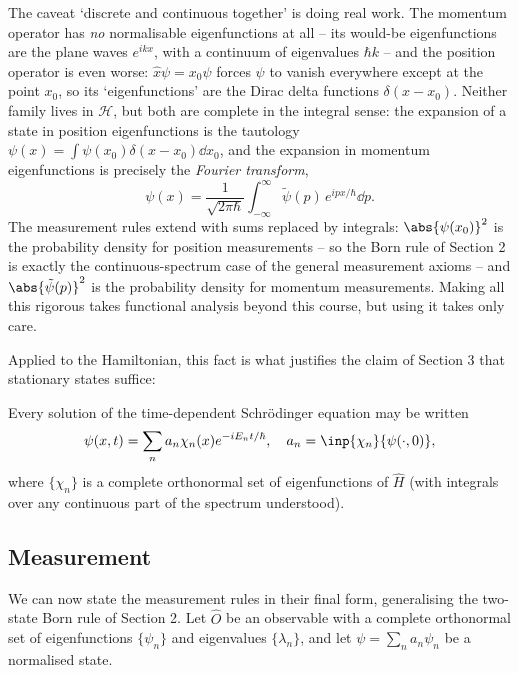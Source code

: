 \begin{remark}
    The caveat `discrete and continuous together' is doing real work. The momentum operator has \emph{no} normalisable eigenfunctions at all -- its would-be eigenfunctions are the plane waves $e^{ikx}$, with a continuum of eigenvalues $\hbar k$ -- and the position operator is even worse: $\hat{x}\psi = x_0 \psi$ forces $\psi$ to vanish everywhere except at the point $x_0$, so its `eigenfunctions' are the Dirac delta functions $\delta(x - x_0)$. Neither family lives in $\mathcal{H}$, but both are complete in the integral sense: the expansion of a state in position eigenfunctions is the tautology $\psi(x) = \int \psi(x_0) \delta(x - x_0) \dd x_0$, and the expansion in momentum eigenfunctions is precisely the \emph{Fourier transform},
    $$
    \psi(x) = \frac{1}{\sqrt{2\pi\hbar}} \int_{-\infty}^{\infty} \tilde{\psi}(p) \, e^{ipx/\hbar} \dd p.
    $$
    The measurement rules extend with sums replaced by integrals: $\abs{\psi(x_0)}^2$ is the probability density for position measurements -- so the Born rule of Section 2 is exactly the continuous-spectrum case of the general measurement axioms -- and $\abs{\tilde\psi(p)}^2$ is the probability density for momentum measurements. Making all this rigorous takes functional analysis beyond this course, but using it takes only care.
\end{remark} Applied to the Hamiltonian, this fact is what justifies the claim of Section 3 that stationary states suffice:

\begin{corollary}
    Every solution of the time-dependent Schr\"odinger equation may be written
    $$
    \psi(x, t) = \sum_n a_n \chi_n(x) e^{-i E_n t/\hbar}, \quad a_n = \inp{\chi_n}{\psi(\cdot, 0)},
    $$
    where $\{\chi_n\}$ is a complete orthonormal set of eigenfunctions of $\hat{H}$ (with integrals over any continuous part of the spectrum understood).
\end{corollary}

\subsection{Measurement}

We can now state the measurement rules in their final form, generalising the two-state Born rule of Section 2. Let $\hat{O}$ be an observable with a complete orthonormal set of eigenfunctions $\{\psi_n\}$ and eigenvalues $\{\lambda_n\}$, and let $\psi = \sum_n a_n \psi_n$ be a normalised state.

